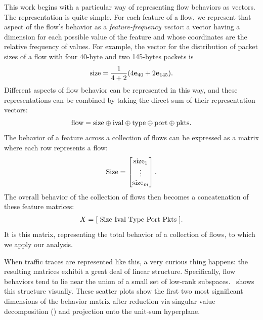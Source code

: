 \documentclass{acm_proc_article-sp}
\begin{document}
This work begins with a particular way of representing flow behaviors as vectors.
The representation is quite simple.
For each feature of a flow, we represent that aspect of the flow's behavior as a \emph{feature-frequency vector}:
a vector having a dimension for each possible value of the feature and whose coordinates are the relative frequency of values.
For example, the vector for the distribution of packet sizes of a flow with four 40-byte and two 145-bytes packets is
\begin{align}
  \text{size} = \frac{1}{4+2}{\left(4\mathbf{e}_{40} + 2\mathbf{e}_{145}\right)}.
\end{align}
Different aspects of flow behavior can be represented in this way, and these representations can be combined by taking the direct sum of their representation vectors:\directsumnote
\begin{align}\eqn{flow}
  \text{flow} =
  \text{size} \directsum
  \text{ival} \directsum
  \text{type} \directsum
  \text{port} \directsum
  \text{pkts}.
\end{align}
The behavior of a feature across a collection of flows can be expressed as a matrix where each row represents a flow:
\begin{align}\eqn{Size}
  \text{Size} = \begin{bmatrix}
    \text{size}_1 \\
    \vdots \\
    \text{size}_m
  \end{bmatrix}.
\end{align}
The overall behavior of the collection of flows then becomes a concatenation of these feature matrices:
\begin{align}\eqn{X}
  X = \bracket{ ~
    \text{Size} ~
    \text{Ival} ~
    \text{Type} ~
    \text{Port} ~
    \text{Pkts} ~
  }.
\end{align}
It is this matrix, representing the total behavior of a collection of flows, to which we apply our analysis.

When traffic traces are represented like this, a very curious thing happens:
the resulting matrices exhibit a great deal of linear structure.
Specifically, flow behaviors tend to lie near the union of a small set of low-rank subspaces.
~shows this structure visually.
These scatter plots show the first two most significant dimensions of the behavior matrix after reduction via singular value decomposition () and projection onto the unit-sum hyperplane.
\end{document}
